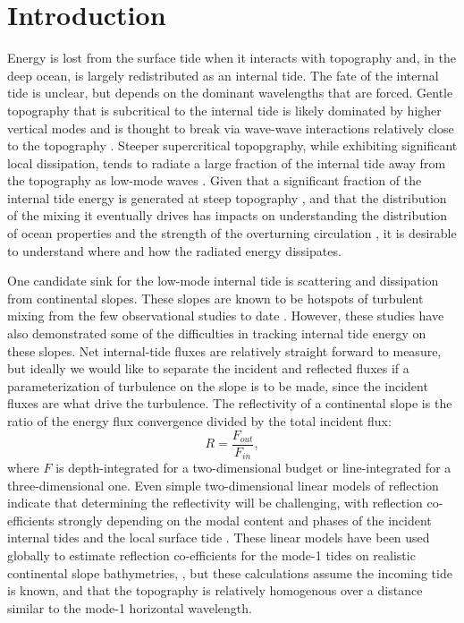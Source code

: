 \documentclass[10pt]{article}
\begin{document}
\section{Introduction}


Energy is lost from the surface tide when it interacts with topography and, in the deep ocean, is largely redistributed as an internal tide.  The fate of the internal tide is unclear, but depends on the dominant wavelengths that are forced.  Gentle topography that is subcritical to the internal tide is likely dominated by higher vertical modes and is thought to break via wave-wave interactions relatively close to the topography \citep[i.e.][]{polzin09,stlaurentgarrett02}.  Steeper supercritical topopgraphy, while exhibiting significant local dissipation, tends to radiate a large fraction of the internal tide away from the topography as low-mode waves \citep[i.e. at Hawaii;][]{klymaketal06b,carteretal08}.  Given that a significant fraction of the internal tide energy is generated at steep topography \citep{leggklymak08}, and that the distribution of the mixing it eventually drives has impacts on understanding the distribution of ocean properties and the strength of the overturning circulation \citep[i.e.][]{meletetal13}, it is desirable to understand where and how the radiated energy dissipates.

One candidate sink for the low-mode internal tide is scattering and dissipation from continental slopes.  These slopes are known to be hotspots of turbulent mixing from the few observational studies to date \citep{nashetal07,klymaketal11a,martinietal13}.  However, these studies have also demonstrated some of the difficulties in tracking internal tide energy on these slopes.  Net internal-tide fluxes are relatively straight forward to measure, but ideally we would like to separate the incident and reflected fluxes if a parameterization of turbulence on the slope is to be made, since the incident fluxes are what drive the turbulence.  The reflectivity of a continental slope is the ratio of the energy flux convergence divided by the total incident flux: 
\begin{equation}
 R = \frac{F_{out}}{F_{in}},
\end{equation}
where $F$ is depth-integrated for a two-dimensional budget or line-integrated for a three-dimensional one.  Even simple two-dimensional linear models of reflection indicate that determining the reflectivity will be challenging, with reflection co-efficients strongly depending on the modal content and phases of the incident internal tides \citep{klymaketal11a} and the local surface tide \citep{kellynash10}.  These linear models have been used globally to estimate reflection co-efficients for the mode-1 tides on realistic continental slope bathymetries, \citep{kellyetal13a,kellyetal13b}, but these calculations assume the incoming tide is known, and that the topography is relatively homogenous over a distance similar to the mode-1 horizontal wavelength.  
\end{document}
